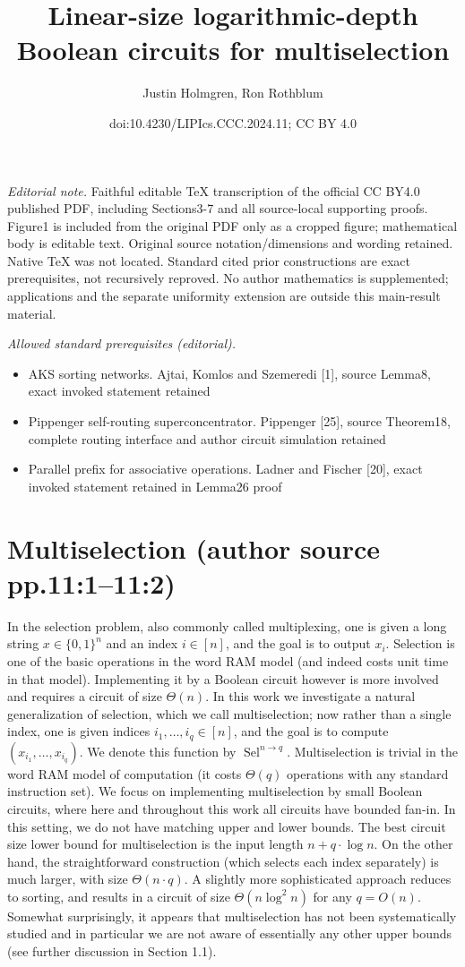 \documentclass[10pt,a4paper]{article}
\title{Linear-size logarithmic-depth Boolean circuits for multiselection}
\author{Justin Holmgren, Ron Rothblum}
\date{doi:10.4230/LIPIcs.CCC.2024.11; CC BY 4.0}
\newcommand{\Sel}{\operatorname{Sel}}
\newcommand{\bits}{\{0,1\}}
\begin{document}
\maketitle
\noindent\textit{Editorial note.} Faithful editable TeX transcription of the official CC BY4.0 published PDF, including Sections3-7 and all source-local supporting proofs. Figure1 is included from the original PDF only as a cropped figure; mathematical body is editable text. Original source notation/dimensions and wording retained. Native TeX was not located. Standard cited prior constructions are exact prerequisites, not recursively reproved. No author mathematics is supplemented; applications and the separate uniformity extension are outside this main-result material.\par\medskip
\noindent\textit{Allowed standard prerequisites (editorial).}\begin{itemize}
\item AKS sorting networks. Ajtai, Komlos and Szemeredi [1], source Lemma8, exact invoked statement retained
\item Pippenger self-routing superconcentrator. Pippenger [25], source Theorem18, complete routing interface and author circuit simulation retained
\item Parallel prefix for associative operations. Ladner and Fischer [20], exact invoked statement retained in Lemma26 proof
\end{itemize}\medskip
\section*{Multiselection (author source pp.11:1--11:2)}
In the selection problem, also commonly called multiplexing, one is given a long string $x\in\bits^n$ and an index $i\in[n]$, and the goal is to output $x_i$. Selection is one of the basic operations in the word RAM model (and indeed costs unit time in that model). Implementing it by a Boolean circuit however is more involved and requires a circuit of size $\Theta(n)$.
In this work we investigate a natural generalization of selection, which we call multiselection; now rather than a single index, one is given indices $i_1,\ldots,i_q\in[n]$, and the goal is to compute $(x_{i_1},\ldots,x_{i_q})$. We denote this function by $\Sel^{n\to q}$. Multiselection is trivial in the word RAM model of computation (it costs $\Theta(q)$ operations with any standard instruction set). We focus on implementing multiselection by small Boolean circuits, where here and throughout this work all circuits have bounded fan-in. In this setting, we do not have matching upper and lower bounds. The best circuit size lower bound for multiselection is the input length $n+q\cdot\log n$. On the other hand, the straightforward construction (which selects each index separately) is much larger, with size $\Theta(n\cdot q)$. A slightly more sophisticated approach reduces to sorting, and results in a circuit of size $\Theta(n\log^2n)$ for any $q=O(n)$. Somewhat surprisingly, it appears that multiselection has not been systematically studied and in particular we are not aware of essentially any other upper bounds (see further discussion in Section 1.1).
\end{document}
